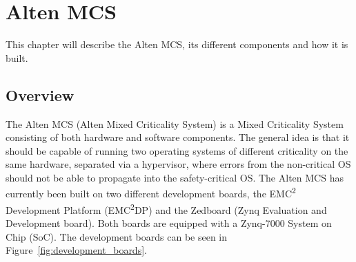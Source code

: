 \chapter{Alten MCS}
\label{sec:lit_emc2mcs}
This chapter will describe the Alten MCS, its different components and how it is built.

\section{Overview}
The Alten MCS (Alten Mixed Criticality System) is a Mixed Criticality System consisting of both hardware and software components. The general idea is that it should be capable of running two operating systems of different criticality on the same hardware, separated via a hypervisor, where errors from the non-critical OS should not be able to propagate into the safety-critical OS. The Alten MCS has currently been built on two different development boards, the EMC\textsuperscript{2} Development Platform (EMC\textsuperscript{2}DP) and the Zedboard (Zynq Evaluation and Development board). Both boards are equipped with a Zynq-7000 System on Chip (SoC). The development boards can be seen in Figure~\ref{fig:development_boards}.

